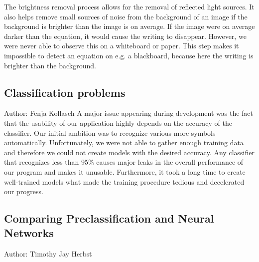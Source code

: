 \documentclass[12pt]{article}
\begin{document}
	The brightness removal process allows for the removal of reflected light sources.
	It also helps remove small sources of noise from the background of an image if the background is brighter than the image is on average.
	If the image were on average darker than the equation, it would cause the writing to disappear.
	However, we were never able to observe this on a whiteboard or paper.
	This step makes it impossible to detect an equation on e.g. a blackboard, because here the writing is brighter than the background.
	
	
	
	
	
	
	
	
	
	\subsection{Classification problems}
	\small{Author: Fenja Kollasch} \newline \newline
	A major issue appearing during development was the fact that the usability of our application highly depends on the accuracy of the classifier. Our initial ambition was to recognize various more symbols automatically. Unfortunately, we were not able to gather enough training data and therefore we could not create models with the desired accuracy. Any classifier that recognizes less than 95\% causes major leaks in the overall performance of our program and makes it unusable. Furthermore, it took a long time to create well-trained models what made the training procedure tedious and decelerated our progress.
	
	\subsection{Comparing Preclassification and Neural Networks}
	\small{Author: Timothy Jay Herbst} \newline \newline
	
\end{document}
